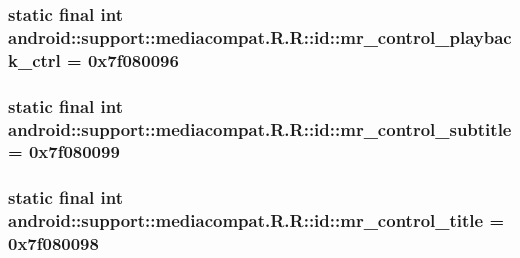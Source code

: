 \hypertarget{classandroid_1_1support_1_1mediacompat_1_1_r_1_1id_ebf71005e6d6d9f9aaadcf78dcd2e306}{
\subsubsection[{mr\_\-control\_\-playback\_\-ctrl}]{\setlength{\rightskip}{0pt plus 5cm}static final int android::support::mediacompat.R.R::id::mr\_\-control\_\-playback\_\-ctrl = 0x7f080096}}
\label{classandroid_1_1support_1_1mediacompat_1_1_r_1_1id_ebf71005e6d6d9f9aaadcf78dcd2e306}


\hypertarget{classandroid_1_1support_1_1mediacompat_1_1_r_1_1id_32354d5b33a21ee147738225beba3e32}{
\subsubsection[{mr\_\-control\_\-subtitle}]{\setlength{\rightskip}{0pt plus 5cm}static final int android::support::mediacompat.R.R::id::mr\_\-control\_\-subtitle = 0x7f080099}}
\label{classandroid_1_1support_1_1mediacompat_1_1_r_1_1id_32354d5b33a21ee147738225beba3e32}


\hypertarget{classandroid_1_1support_1_1mediacompat_1_1_r_1_1id_472622b67c7b95bbe495833360da0ed9}{
\subsubsection[{mr\_\-control\_\-title}]{\setlength{\rightskip}{0pt plus 5cm}static final int android::support::mediacompat.R.R::id::mr\_\-control\_\-title = 0x7f080098}}
\label{classandroid_1_1support_1_1mediacompat_1_1_r_1_1id_472622b67c7b95bbe495833360da0ed9}


